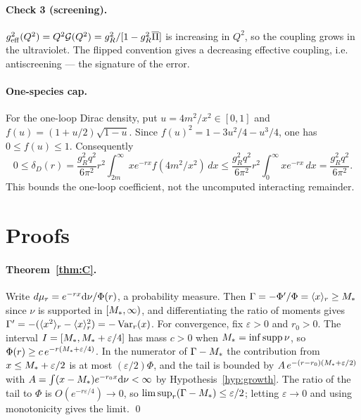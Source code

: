 \paragraph{Check 3 (screening).}
$g^{2}_{\mathrm{eff}}(Q^{2})=Q^{2}\mathcal{G}(Q^{2})=g_{R}^{2}/[1-g_{R}^{2}
\overline{\Pi}]$ is increasing in $Q^{2}$, so the coupling grows in the
ultraviolet. The flipped convention gives a decreasing effective coupling,
i.e. antiscreening --- the signature of the error.

\paragraph{One-species cap.}\label{app:cap}
For the one-loop Dirac density, put $u=4m^2/x^2\in[0,1]$ and
$f(u)=(1+u/2)\sqrt{1-u}$. Since
$f(u)^2=1-3u^2/4-u^3/4$, one has $0\le f(u)\le1$. Consequently
\begin{equation}
0\le\delta_D(r)=\frac{g_R^2q^2}{6\pi^2}r^2
\int_{2m}^{\infty}x e^{-rx}f(4m^2/x^2)\,dx
\le\frac{g_R^2q^2}{6\pi^2}r^2\int_0^{\infty}x e^{-rx}\,dx
=\frac{g_R^2q^2}{6\pi^2}.
\end{equation}
This bounds the one-loop coefficient, not the uncomputed interacting remainder.

\section{Proofs}
\label{app:proofs}

\paragraph{Theorem~\ref{thm:C}.}
Write $d\mu_{r}=e^{-rx}\mathrm{d}\nu/\Phi(r)$, a probability measure. Then
$\Gamma=-\Phi'/\Phi=\langle x\rangle_{r}\ge M_{*}$ since $\nu$ is supported in
$[M_{*},\infty)$, and differentiating the ratio of moments gives
$\Gamma'=-(\langle x^{2}\rangle_{r}-\langle x\rangle_{r}^{2})=-\operatorname{Var}_{r}(x)$.
For convergence, fix $\varepsilon>0$ and $r_{0}>0$. The interval
$I=[M_{*},M_{*}+\varepsilon/4]$ has mass $c>0$ when $M_{*}=\inf\operatorname{supp}\nu$, so
$\Phi(r)\ge c\,e^{-r(M_{*}+\varepsilon/4)}$. In the numerator of
$\Gamma-M_{*}$ the contribution from $x\le M_{*}+\varepsilon/2$ is at most
$(\varepsilon/2)\Phi$, and the tail is bounded by
$A\,e^{-(r-r_{0})(M_{*}+\varepsilon/2)}$ with
$A=\int(x-M_{*})e^{-r_{0}x}\mathrm{d}\nu<\infty$ by Hypothesis~\ref{hyp:growth}. The
ratio of the tail to $\Phi$ is $O(e^{-r\varepsilon/4})\to0$, so
$\limsup_{r}(\Gamma-M_{*})\le\varepsilon/2$; letting $\varepsilon\to0$ and
using monotonicity gives the limit. \qed

